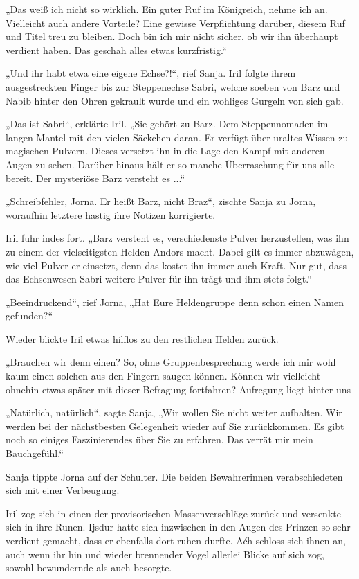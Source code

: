 „Das weiß ich nicht so wirklich. Ein guter Ruf im Königreich, nehme ich an. Vielleicht auch andere Vorteile? Eine gewisse Verpflichtung darüber, diesem Ruf und Titel treu zu bleiben. Doch bin ich mir nicht sicher, ob wir ihn überhaupt verdient haben. Das geschah alles etwas kurzfristig.“

„Und ihr habt etwa eine eigene Echse?!“, rief Sanja. Iril folgte ihrem ausgestreckten Finger bis zur Steppenechse Sabri, welche soeben von Barz und Nabib hinter den Ohren gekrault wurde und ein wohliges Gurgeln von sich gab.

„Das ist Sabri“, erklärte Iril. „Sie gehört zu Barz. Dem Steppennomaden im langen Mantel mit den vielen Säckchen daran. Er verfügt über uraltes Wissen zu magischen Pulvern. Dieses versetzt ihn in die Lage den Kampf mit anderen Augen zu sehen. Darüber hinaus hält er so manche Überraschung für uns alle bereit. Der mysteriöse Barz versteht es ...“

„Schreibfehler, Jorna. Er heißt Barz, nicht Braz“, zischte Sanja zu Jorna, woraufhin letztere hastig ihre Notizen korrigierte.

Iril fuhr indes fort. „Barz versteht es, verschiedenste Pulver herzustellen, was ihn zu einem der vielseitigsten Helden Andors macht. Dabei gilt es immer abzuwägen, wie viel Pulver er einsetzt, denn das kostet ihn immer auch Kraft. Nur gut, dass das Echsenwesen Sabri weitere Pulver für ihn trägt und ihm stets folgt.“

„Beeindruckend“, rief Jorna, „Hat Eure Heldengruppe denn schon einen Namen gefunden?“

Wieder blickte Iril etwas hilflos zu den restlichen Helden zurück.

„Brauchen wir denn einen? So, ohne Gruppenbesprechung werde ich mir wohl kaum einen solchen aus den Fingern saugen können. Können wir vielleicht ohnehin etwas später mit dieser Befragung fortfahren? Aufregung liegt hinter uns

„Natürlich, natürlich“, sagte Sanja, „Wir wollen Sie nicht weiter aufhalten. Wir werden bei der nächstbesten Gelegenheit wieder auf Sie zurückkommen. Es gibt noch so einiges Faszinierendes über Sie zu erfahren. Das verrät mir mein Bauchgefühl.“

Sanja tippte Jorna auf der Schulter. Die beiden Bewahrerinnen verabschiedeten sich mit einer Verbeugung.\bigskip







Iril zog sich in einen der provisorischen Massenverschläge zurück und versenkte sich in ihre Runen. Ijsdur hatte sich inzwischen in den Augen des Prinzen so sehr verdient gemacht, dass er ebenfalls dort ruhen durfte. Aćh schloss sich ihnen an, auch wenn ihr hin und wieder brennender Vogel allerlei Blicke auf sich zog, sowohl bewundernde als auch besorgte.

